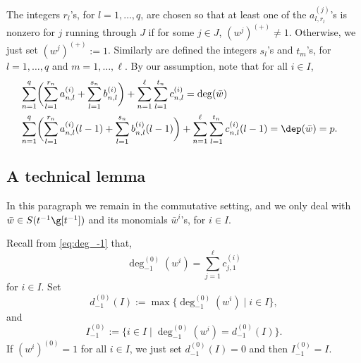 The integers $r_l$'s, for $l=1,\dots,q$, are chosen so that at least one of the
$a_{l,r_l}^{(j)}$'s is nonzero for $j$ running through $J$
if for some $j \in J$, $(w^{j})^{(+)}\not= 1$.
Otherwise, we just set $(w^{j})^{(+)} := 1$.
Similarly are defined the integers $s_l$'s and $t_m$'s,
for $l =1,\dots,q$ and $m=1,\dots,\ell$. By our assumption, note that for all $i \in I$,
\begin{align*}
& \sum_{n=1}^q \biggl(\sum_{l=1}^{r_n}
a_{n,l}^{(i)} + \sum_{l=1}^{s_n} b_{n,l}^{(i)} \biggr)
+ \sum_{n=1}^\ell \sum_{l=1}^{t_n} c_{n,l}^{(i)} = \deg(\bar w)&\\
& \sum_{n=1}^q \biggl(\sum_{l=1}^{r_n}
a_{n,l}^{(i)} (l-1) + \sum_{l=1}^{s_n} b_{n,l}^{(i)} (l-1) \biggr)
+ \sum_{n=1}^\ell \sum_{l=1}^{t_n} c_{n,l}^{(i)} (l-1)
= \dep(\bar w) = p.&
\end{align*}

\subsection{A technical lemma}
\label{sub:technical}
In this paragraph we remain in the commutative setting, and we only
deal with $\bar w \in S(t^{-1}\g[t^{-1}])$ and its monomials $\bar w^{i}$'s,
for $ i \in I$.

Recall from \eqref{eq:deg_-1} that,
\[
\deg_{-1}^{(0)}(w^i)= \sum_{j=1}^\ell c_{j,1}^{(i)}
\]
for $i \in I$.
Set
\[
d_{-1}^{(0)}(I) := \max\{\deg_{-1}^{(0)}(w^i) \mid i \in I\},
\]
and
\[
I_{-1}^{(0)} := \{ i\in I \mid \deg_{-1}^{(0)}(w^i)= d_{-1}^{(0)}(I)\}.
\]
If $(w^i)^{(0)}=1$ for all $i \in I$, we just set $d_{-1}^{(0)}(I)=0$
and then $I_{-1}^{(0)}=I$.


